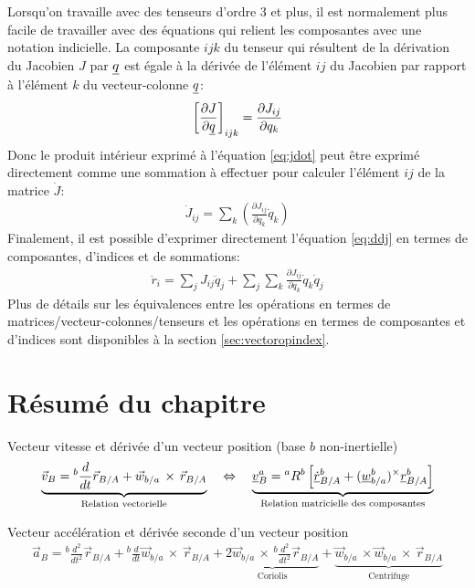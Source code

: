 Lorsqu'on travaille avec des tenseurs d'ordre 3 et plus, il est normalement plus facile de travailler avec des équations qui relient les composantes avec une notation indicielle. La composante $ijk$ du tenseur qui résultent de la dérivation du Jacobien $J$ par $\underline{q}$ est égale à la dérivée de l'élément $ij$ du Jacobien par rapport à l'élément $k$ du vecteur-colonne $\underline{q}$:
\begin{align}
	\left[\frac{ \partial J}{\partial \underline{q}} \right]_{ijk} = \frac{ \partial J_{ij} }{\partial q_k }
\end{align}
Donc le produit intérieur exprimé à l'équation \eqref{eq:jdot} peut être exprimé directement comme une sommation à effectuer pour calculer l'élément $ij$ de la matrice $\dot{J}$:
\begin{align}
	\dot{J}_{ij} = \sum_k \left( \frac{ \partial J_{ij} }{\partial q_k } \dot{q}_k \right)
\end{align}
Finalement, il est possible d'exprimer directement l'équation \eqref{eq:ddj} en termes de composantes, d'indices et de sommations:
\begin{align}
	\ddot{r}_{i} =
	\sum_j J_{ij} \ddot{q}_j
	+
	\sum_j
	\sum_k  \frac{ \partial J_{ij} }{\partial q_k } \dot{q}_k
	\dot{q}_j
\end{align}
Plus de détails sur les équivalences entre les opérations en termes de matrices/vecteur-colonnes/tenseurs et les opérations en termes de composantes et d'indices sont disponibles à la section \ref{sec:vectoropindex}.




\newpage
\section{Résumé du chapitre}


Vecteur vitesse et dérivée d'un vecteur position (base $b$ non-inertielle)
\begin{align}
	\underbrace{
		\vec{v}_{B} = {}^{b}\frac{d}{dt} \vec{r}_{B/A} +  \vec{w}_{b/a} \, \times \, \vec{r}_{B/A}
	}_{\text{Relation vectorielle}}
	\quad \Leftrightarrow \quad
	\underbrace{
		\underline{v}_{B}^{a} = {}^{a}R^b \left[ \underline{\dot{r}}^b_{B/A} +  (\underline{w}_{b/a}^b)^{\times} \underline{r}^b_{B/A}  \right]
	}_{\text{Relation matricielle des composantes}}
\end{align}

Vecteur accélération et dérivée seconde d'un vecteur position
\begin{align}
	\vec{a}_{B} =
	{}^{b}\frac{d^2}{dt^2} \vec{r}_{B/A}
	+
	{}^{b}\frac{d}{dt} \vec{w}_{b/a} \, \times \, \vec{r}_{B/A}
	+
	\underbrace{
		2 \vec{w}_{b/a} \, \times \, {}^{b}\frac{d^2}{dt^2} \vec{r}_{B/A}
	}_{\text{Coriolis}}
	+
	\underbrace{
		\vec{w}_{b/a} \, \times \vec{w}_{b/a} \, \times \,
		\vec{r}_{B/A}
	}_{\text{Centrifuge}}
\end{align}

